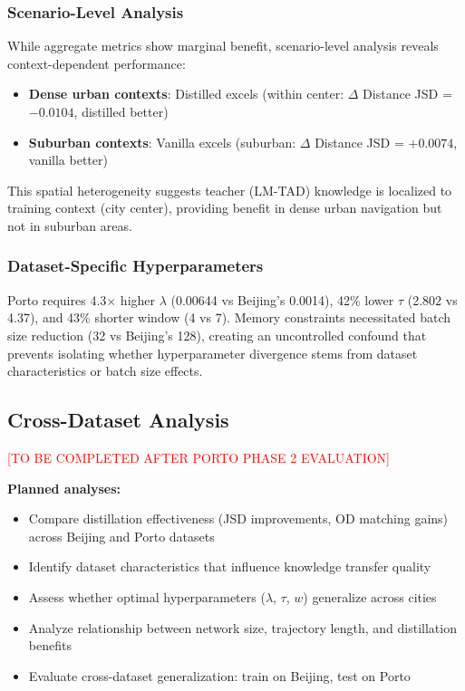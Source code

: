\subsubsection{Scenario-Level Analysis}

While aggregate metrics show marginal benefit, scenario-level analysis reveals context-dependent performance:
\begin{itemize}[leftmargin=*,noitemsep]
    \item \textbf{Dense urban contexts}: Distilled excels (within center: $\Delta$ Distance JSD = $-0.0104$, distilled better)
    \item \textbf{Suburban contexts}: Vanilla excels (suburban: $\Delta$ Distance JSD = $+0.0074$, vanilla better)
\end{itemize}

This spatial heterogeneity suggests teacher (LM-TAD) knowledge is localized to training context (city center), providing benefit in dense urban navigation but not in suburban areas.

\subsubsection{Dataset-Specific Hyperparameters}

Porto requires 4.3$\times$ higher $\lambda$ (0.00644 vs Beijing's 0.0014), 42\% lower $\tau$ (2.802 vs 4.37), and 43\% shorter window (4 vs 7). Memory constraints necessitated batch size reduction (32 vs Beijing's 128), creating an uncontrolled confound that prevents isolating whether hyperparameter divergence stems from dataset characteristics or batch size effects.

\subsection{Cross-Dataset Analysis}
\label{sec:eval-cross}

\textcolor{red}{[TO BE COMPLETED AFTER PORTO PHASE 2 EVALUATION]}

\textbf{Planned analyses:}
\begin{itemize}[noitemsep,topsep=0pt]
    \item Compare distillation effectiveness (JSD improvements, OD matching gains) across Beijing and Porto datasets
    \item Identify dataset characteristics that influence knowledge transfer quality
    \item Assess whether optimal hyperparameters ($\lambda$, $\tau$, $w$) generalize across cities
    \item Analyze relationship between network size, trajectory length, and distillation benefits
    \item Evaluate cross-dataset generalization: train on Beijing, test on Porto
\end{itemize}

